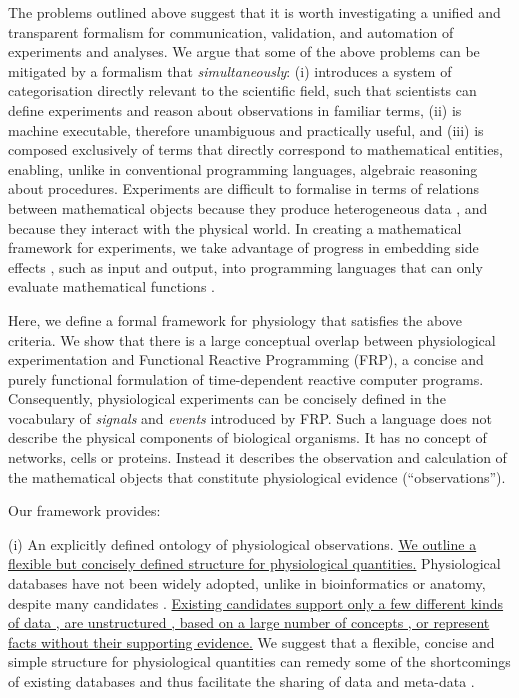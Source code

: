 The problems outlined above suggest that it is worth investigating a
unified and transparent formalism for communication, validation, and
automation of experiments and analyses. We argue that
some of the above problems can be mitigated by a formalism that
\emph{simultaneously}: (i) introduces a system of categorisation
directly relevant to the scientific field, such that scientists can
define experiments and reason about observations in familiar terms,
(ii) is machine executable, therefore unambiguous and practically
useful, and (iii) is composed exclusively of terms that directly
correspond to mathematical entities, enabling, unlike in conventional
programming languages, algebraic reasoning about procedures.
Experiments are difficult to formalise in terms of relations between
mathematical objects because they produce heterogeneous data
\cite{Tukey1962}, and because they interact with the physical
world. In creating a mathematical framework for experiments, we take
advantage of progress in embedding side effects \cite{PeytonJones2002,
  Roy2004, Wadler1995}, such as input and output, into programming
languages that can only evaluate mathematical functions
\cite{Church1941}.

Here, we define a formal framework for physiology
that satisfies the above criteria. We show that there
is a large conceptual overlap between physiological experimentation
and Functional Reactive Programming (FRP\cite{Elliott1997,
  Nilsson2002}), a concise and purely functional formulation of
time-dependent reactive computer programs. Consequently, physiological
experiments can be concisely defined in the vocabulary of
\emph{signals} and \emph{events} introduced by FRP. Such a language
does not describe the physical components of biological organisms. It
has no concept of networks, cells or proteins. Instead it describes
the observation and calculation of the mathematical objects that
constitute physiological evidence (``observations'').

Our framework provides:

(i) An explicitly defined ontology of physiological observations. \underline{We
outline a flexible but concisely defined structure for physiological
quantities.} Physiological databases have not been widely
adopted\cite{Herz2008, Amari2002}, unlike in bioinformatics or
anatomy, despite many candidates \cite{Jessop2010, Teeters2008,
  Frishkoff2009, Katz2010}. \underline{Existing candidates support only a
  few different kinds of data , are unstructured
  , based on a large number of concepts
  , or represent facts without their supporting
  evidence.}
We suggest that a flexible, concise and simple structure for
physiological quantities can remedy some of the
shortcomings\cite{Gardner2005, Amari2002} of existing databases and
thus facilitate the sharing of data and meta-data \cite{Insel2003}.

